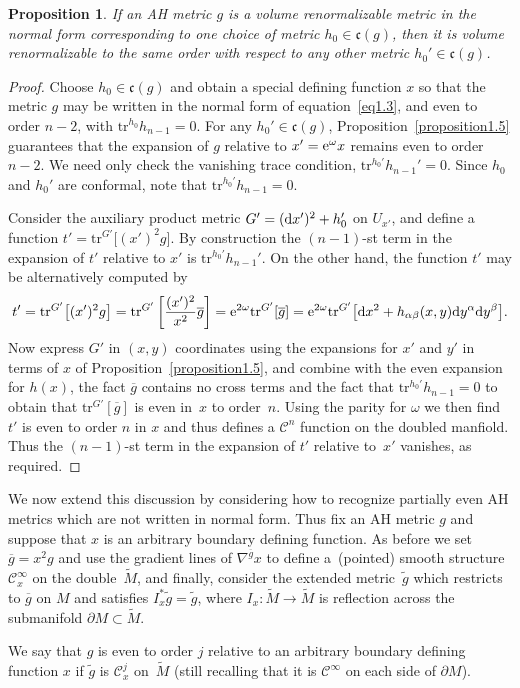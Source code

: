 \documentclass[pdftex]{sigma}
\numberwithin{equation}{section}
\newtheorem{Proposition}[Theorem]{Proposition}
 { \theoremstyle{definition}
\newtheorem{Definition}[Theorem]{Definition}
\newtheorem{Example}[Theorem]{Example}
\newtheorem{Remark}[Theorem]{Remark} }
\newcommand{\wt}{\widetilde}
\newcommand{\del}{\partial}
\newcommand{\olg}{\overline{g}}
\newcommand{\frakc}{\mathfrak c}
\newcommand{\calC}{\mathcal C}
\newcommand{\tr}{\mathrm{tr}}
\newcommand{\gbar}{\overline{g}}
\begin{document}
\begin{Proposition}\label{proposition1.5b}
If an AH metric $g$ is a volume renormalizable metric in the normal form corresponding to one choice of metric $h_0 \in \frakc (g)$,
then it is volume renormalizable to the same order with respect to any other metric $h_0' \in \frakc(g)$.
\end{Proposition}
\begin{proof} Choose $h_0 \in \frakc (g)$ and obtain a special defining function $x$ so that the metric $g$ may be written in the normal form of equation~\eqref{eq1.3}, and even to order $n-2$, with $\tr^{h_0} h_{n-1} = 0$. For any $h_0' \in \frakc(g)$, Proposition~\ref{proposition1.5} guarantees that the expansion of $g$ relative to $x' = {\rm e}^{\omega} x$ remains even to order $n-2$. We need only check the vanishing trace condition, $\tr^{h_0'} h_{n-1}' = 0$. Since $h_0$ and $h_0'$ are conformal, note that $\tr^{h_0'} h_{n-1} = 0$.
	
Consider the auxiliary product metric $G' = ({\rm d}x')^2 + h_0'$ on $U_{x'}$, and define a function $t' = \tr^{G'} \big[(x')^2 g\big]$. By construction the $(n-1)$-st term in the expansion of $t'$ relative to $x'$ is $\tr^{h_0'} h_{n-1}'$. On the other hand, the function $t'$ may be alternatively computed by
\begin{gather*}
	t' = \tr^{G'} \big[(x')^2 g\big] = \tr^{G'} \left[ \frac{(x')^2}{x^2} \gbar \right]
	= {\rm e}^{2\omega} \tr^{G'} [ \gbar ] = {\rm e}^{2\omega} \tr^{G'} \big[ {\rm d}x^2 + h_{\alpha \beta}(x,y) {\rm d}y^{\alpha} {\rm d}y^{\beta} \big].
\end{gather*}
Now express $G'$ in $(x,y)$ coordinates using the expansions for $x'$ and $y'$ in terms of $x$ of Proposition~\ref{proposition1.5}, and combine with the even expansion for $h(x)$, the fact $\gbar$ contains no cross terms and the fact that $\tr^{h_0'} h_{n-1} = 0$ to obtain that $\tr^{G'} [ \gbar ]$ is even in~$x$ to order~$n$. Using the parity for $\omega$ we then find $t'$ is even to order $n$ in $x$ and thus defines a $\calC^n$ function on the doubled manfiold. Thus the $(n-1)$-st term in the expansion of $t'$ relative to~$x'$ vanishes, as required.
\end{proof}

We now extend this discussion by considering how to recognize partially even AH metrics which are not written in
normal form. Thus fix an AH metric $g$ and suppose that $x$ is an arbitrary boundary defining function. As before
we set $\olg = x^2 g$ and use the gradient lines of $\nabla^{\olg} x$ to define a~(pointed) smooth structure $\calC^{\infty}_x$ on the
double~$\wt{M}$, and finally, consider the extended metric~$\tilde{g}$ which restricts to $\olg$ on $M$ and
satisfies $I_x^* \tilde{g} = \tilde{g}$, where $I_x\colon \wt{M} \to \wt{M}$ is reflection across the submanifold $\del M \subset \wt{M}$.
\begin{Definition}\label{definition1.6} \label{defn-even}
We say that $g$ is even to order $j$ relative to an arbitrary boundary defining function $x$ if $\tilde{g}$ is $\calC^{j}_x$ on~$\wt{M}$ (still recalling that it is $\calC^\infty$ on each side of $\del M$).
\end{Definition}
\end{document}
